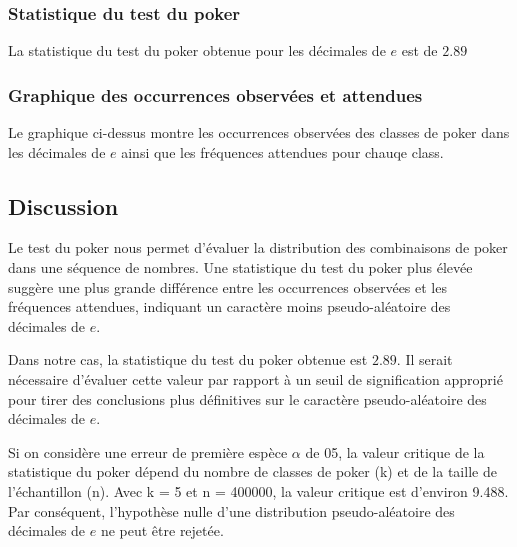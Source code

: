 \documentclass{article}
\begin{document}
\subsubsection{Statistique du test du poker}

La statistique du test du poker obtenue pour les décimales de \(e\) est de \(2.89\)

\subsubsection{Graphique des occurrences observées et attendues}

\begin{center}
\end{center}

Le graphique ci-dessus montre les occurrences observées des classes de poker dans les décimales de \(e\) ainsi que les fréquences attendues pour chauqe class.

\subsection{Discussion}

Le test du poker nous permet d'évaluer la distribution des combinaisons de poker dans une séquence de nombres. Une statistique du test du poker plus élevée suggère une plus grande différence entre les occurrences observées et les fréquences attendues, indiquant un caractère moins pseudo-aléatoire des décimales de \(e\).

Dans notre cas, la statistique du test du poker obtenue est \(2.89\). Il serait nécessaire d'évaluer cette valeur par rapport à un seuil de signification approprié pour tirer des conclusions plus définitives sur le caractère pseudo-aléatoire des décimales de \(e\).

Si on considère une erreur de première espèce $\alpha$ de 05, la valeur critique de la statistique du poker dépend du nombre de classes de poker (k) et de la taille de l'échantillon (n). Avec k = 5 et n = 400000, la valeur critique est d'environ 9.488. Par conséquent, l'hypothèse nulle d'une distribution pseudo-aléatoire des décimales de \(e\) ne peut être rejetée.
\end{document}
